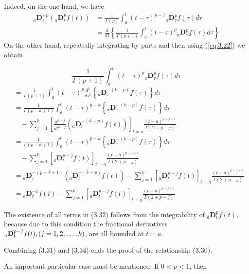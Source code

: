 \documentclass[a4paper,14pt,oneside]{book}
\theoremstyle{plain}
\theoremstyle{definition}
\theoremstyle{remark}
\begin{document}
\begin{center}
\begin{flushleft}
Indeed, on the one hand, we have
\begin{align}\label{eq:3.31}
{ }_{a} \mathbf{D}_{t}^{-p}\left({ }_{a} \mathbf{D}_{t}^{p} f(t)\right) &=\frac{1}{\Gamma(p)} \int_{a}^{t}(t-\tau)^{p-1}{ }_{a} \mathbf{D}_{\tau}^{p} f(\tau) d \tau\nonumber \\
&=\frac{d}{d t}\left\{\frac{1}{\Gamma(p+1)} \int_{a}^{t}(t-\tau)^{p}{ }_{a} \mathbf{D}_{\tau}^{p} f(\tau) d \tau\right\}
\end{align}
On the other hand, repeatedly integrating by parts and then using (\ref{eq:3.22}) we obtain

$$
\frac{1}{\Gamma(p+1)} \int_{a}^{t}(t-\tau)^{p}{ }_{a} \mathbf{D}_{\tau}^{p} f(\tau) d \tau
$$
\begin{align}
&=\frac{1}{\Gamma(p+1)} \int_{a}^{t}(t-\tau)^{p} \frac{d^{k}}{d \tau^{k}}\left\{{ }_{a} \mathbf{D}_{\tau}^{-(k-p)} f(\tau)\right\} d \tau\nonumber \\
&=\frac{1}{\Gamma(p-k+1)} \int_{a}^{t}(t-\tau)^{p-k}\left\{{ }_{a} \mathbf{D}_{\tau}^{-(k-p)} f(\tau)\right\} d \tau \nonumber\\
&~~~~ -\sum_{j=1}^{k}\left[\frac{d^{k-j}}{d t^{k-j}}\left({ }_{a} \mathbf{D}_{t}^{-(k-p)} f(t)\right)\right]_{t=a} \frac{(t-a)^{p-j+1}}{\Gamma(2+p-j)}\nonumber \\
&=\frac{1}{\Gamma(p-k+1)} \int_{a}^{t}(t-\tau)^{p-k}\left\{{ }_{a} \mathbf{D}_{\tau}^{-(k-p)} f(\tau)\right\} d\tau \nonumber\\
&~~~~ -\sum_{j=1}^{k}\left[{ }_{a} \mathbf{D}_{t}^{p-j} f(t)\right]_{t=a} \frac{(t-a)^{p-j+1}}{\Gamma(2+p-j)}\\
&={ }_{a} \mathbf{D}_{t}^{-(p-k+1)}\left({ }_{a} \mathbf{D}_{t}^{-(k-p)} f(t)\right)
-\sum_{j=1}^{k}\left[{ }_{a} \mathbf{D}_{t}^{p-j} f(t)\right]_{t=a} \frac{(t-a)^{p-j+1}}{\Gamma(2+p-j)}\\
&={ }_{a} \mathbf{D}_{t}^{-1} f(t)-\sum_{j=1}^{k}\left[{ }_{a} \mathbf{D}_{t}^{p-j} f(t)\right]_{t=a} \frac{(t-a)^{p-j+1}}{\Gamma(2+p-j)}
\end{align}
\par The existence of all terms in (3.32) follows from the integrability of ${ }_{a} \mathbf{D}_{t}^{p} f(t)$, because due to this condition the fractional derivatives ${ }_{a} \mathbf{D}_{t}^{p-j} f(t),\\ (j=1,2, \ldots, k)$, are all bounded at $t=a$.
\par Combining (3.31) and (3.34) ends the proof of the relationship (3.30).
\par An important particular case must be mentioned. If $0<p<1$, then

\end{flushleft}
\end{center}
\end{document}
